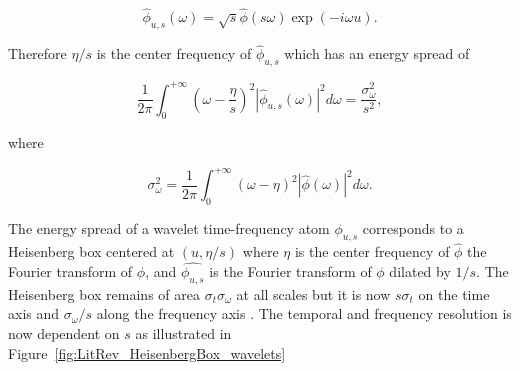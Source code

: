 \begin{equation}\label{eq:Mallat1999_453}
\hat{\phi}_{u,s}(\omega) = \sqrt{s}\hat{\phi}(s\omega) \exp{(-i\omega u)}.
\end{equation}

Therefore $\eta / s$ is the center frequency of $\hat{\phi}_{u,s}$ which has an energy spread of

\begin{equation}\label{eq:Mallat1999_454}
\frac{1}{2\pi} \int^{+\infty}_{0} \left( \omega - \frac{\eta}{s}\right)^2 \left| \hat{\phi}_{u,s}(\omega)\right|^2 d\omega = \frac{\sigma^2_\omega}{s^2},
\end{equation}

where

\begin{equation}\label{eq:Mallat1999_4545}
\sigma^2_\omega = \frac{1}{2\pi} \int^{+\infty}_0 (\omega - \eta)^2 |\hat{\phi}(\omega)|^2 d\omega.
\end{equation}

The energy spread of a wavelet time-frequency atom $\phi_{u,s}$ corresponds to a Heisenberg box centered at $(u,\eta/s)$ where $\eta$ is the center frequency of $\hat{\phi}$ the Fourier transform of $\phi$, and $\hat{\phi_{u,s}}$ is the Fourier transform of $\phi$ dilated by $1/s$. The Heisenberg box remains of area $\sigma_t \sigma_\omega$ at all scales but it is now $s\sigma_t$ on the time axis and $\sigma_\omega /s$ along the frequency axis \cite{Mallat1999}. The temporal and frequency resolution is now dependent on $s$ as illustrated in Figure~\ref{fig:LitRev_HeisenbergBox_wavelets}





